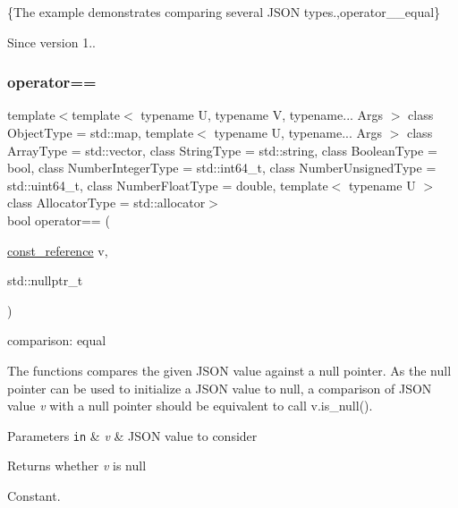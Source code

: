 \{The example demonstrates comparing several J\+S\+ON types.,operator\+\_\+\+\_\+equal\}

\begin{DoxySince}{Since}
version 1.. 
\end{DoxySince}
\hypertarget{classnlohmann_1_1basic__json_a9730b9f7bc2150e641fe20198d4477c7}{}\label{classnlohmann_1_1basic__json_a9730b9f7bc2150e641fe20198d4477c7} 
\subsubsection{\texorpdfstring{operator==}{operator==}\hspace{0.1cm}{\footnotesize\ttfamily [2/3]}}
{\footnotesize\ttfamily template$<$template$<$ typename U, typename V, typename... Args $>$ class Object\+Type = std\+::map, template$<$ typename U, typename... Args $>$ class Array\+Type = std\+::vector, class String\+Type  = std\+::string, class Boolean\+Type  = bool, class Number\+Integer\+Type  = std\+::int64\+\_\+t, class Number\+Unsigned\+Type  = std\+::uint64\+\_\+t, class Number\+Float\+Type  = double, template$<$ typename U $>$ class Allocator\+Type = std\+::allocator$>$ \\
bool operator== (\begin{DoxyParamCaption}\item[{\hyperlink{classnlohmann_1_1basic__json_af677a29b0e66edc9f66e5167e4667071}{const\+\_\+reference}}]{v,  }\item[{std\+::nullptr\+\_\+t}]{ }\end{DoxyParamCaption})\hspace{0.3cm}{\ttfamily [friend]}}



comparison\+: equal 

The functions compares the given J\+S\+ON value against a null pointer. As the null pointer can be used to initialize a J\+S\+ON value to null, a comparison of J\+S\+ON value {\itshape v} with a null pointer should be equivalent to call {\ttfamily v.\+is\+\_\+null()}.


\begin{DoxyParams}[1]{Parameters}
\mbox{\tt in}  & {\em v} & J\+S\+ON value to consider \\
\hline
\end{DoxyParams}
\begin{DoxyReturn}{Returns}
whether {\itshape v} is null
\end{DoxyReturn}
Constant.

